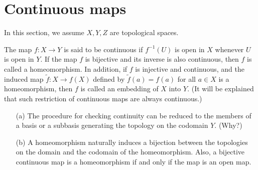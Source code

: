 \section{Continuous maps}

In this section, we assume $X, Y, Z$ are topological spaces.

\begin{defi}[Continuity]
    The map $f: X\rightarrow Y$ is said to be continuous if $f^{-1}(U)$ is open in $X$ whenever $U$ is open in $Y$.
    If the map $f$ is bijective and its inverse is also continuous, then $f$ is called a homeomorphism.
    In addition, if $f$ is injective and continuous, and the induced map $\widetilde{f}: X\rightarrow f(X)$ defined by $\widetilde{f}(a)=f(a)$ for all $a\in X$ is a homeomorphism, then $f$ is called an embedding of $X$ into $Y$.
    (It will be explained that such restriction of continuous maps are always continuous.)
\end{defi}

\begin{rmk}
    \begin{enumerate}
        \item[(a)]
        {
            The procedure for checking continuity can be reduced to the members of a basis or a subbasis generating the topology on the codomain $Y$. \color{brown}(Why?)\color{black}
        }
        \item[(b)]
        {
            A homeomorphism naturally induces a bijection between the topologies on the domain and the codomain of the homeomorphism. Also, a bijective continuous map is a homeomorphism if and only if the map is an open map.
        }
    \end{enumerate}
\end{rmk}

